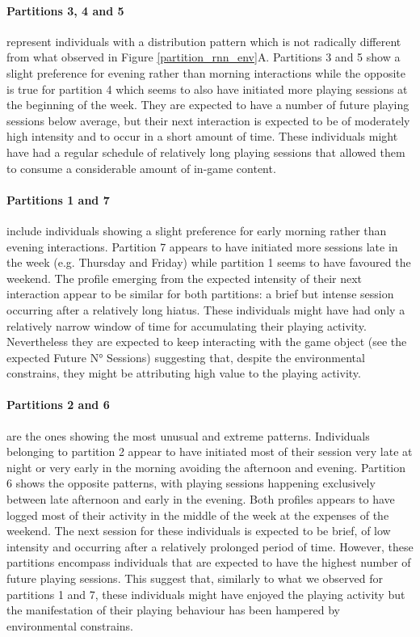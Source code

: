 \paragraph*{\textbf{Partitions 3, 4 and 5}} represent individuals with a distribution pattern which is not radically different from what observed in Figure \ref{partition_rnn_env}A. Partitions 3 and 5 show a slight preference for evening rather than morning interactions while the opposite is true for partition 4 which seems to also have initiated more playing sessions at the beginning of the week. They are expected to have a number of future playing sessions below average, but their next interaction is expected to be of moderately high intensity and to occur in a short amount of time. These individuals might have had a regular schedule of relatively long playing sessions that allowed them to consume a considerable amount of in-game content.

\paragraph*{\textbf{Partitions 1 and 7}} include individuals showing a slight preference for early morning rather than evening interactions. Partition 7 appears to have initiated more sessions late in the week (e.g. Thursday and Friday) while partition 1 seems to have favoured the weekend. The profile emerging from the expected intensity of their next interaction appear to be similar for both partitions: a brief but intense session occurring after a relatively long hiatus. These individuals might have had only a relatively narrow window of time for accumulating their playing activity.  Nevertheless they are expected to keep interacting with the game object (see the expected Future N° Sessions) suggesting that, despite the environmental constrains, they might be attributing high value to the playing activity.

\paragraph*{\textbf{Partitions 2 and 6}} are the ones showing the most unusual and extreme patterns. Individuals belonging to partition 2 appear to have initiated most of their session very late at night or very early in the morning avoiding the afternoon and evening. Partition 6 shows the opposite patterns, with playing sessions happening exclusively between late afternoon and early in the evening. Both profiles appears to have logged most of their activity in the middle of the week at the expenses of the weekend. The next session for these individuals is expected to be brief, of low intensity and occurring after a relatively prolonged period of time. However, these partitions encompass individuals that are expected to have the highest number of future playing sessions. This suggest that, similarly to what we observed for partitions 1 and 7, these individuals might have enjoyed the playing activity but the manifestation of their playing behaviour has been hampered by environmental constrains.

